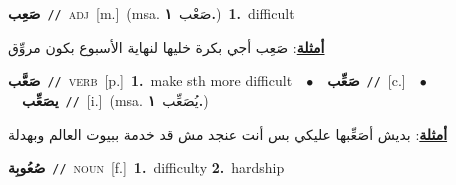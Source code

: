 \documentclass[10pt,a4paper,twoside]{article} %
\begin{document}
\begin{multicols}{2}
{\setlength\topsep{0pt}\textbf{\foreignlanguage{arabic}{صَعِب}}\ {\color{gray}\texttt{//}\color{black}}\ \textsc{adj}\ [m.]\ \color{gray}(msa. \foreignlanguage{arabic}{صَعْب}~\foreignlanguage{arabic}{\textbf{١.}})\color{black}\ \textbf{1.}~difficult\  \begin{flushright}\color{gray}\foreignlanguage{arabic}{\textbf{\underline{\foreignlanguage{arabic}{أمثلة}}}: صَعِب أجي بكرة خليها لنهاية الأسبوع بكون مروِّق}\end{flushright}\color{black}} \vspace{2mm}

{\setlength\topsep{0pt}\textbf{\foreignlanguage{arabic}{صَعَّب}}\ {\color{gray}\texttt{//}\color{black}}\ \textsc{verb}\ [p.]\ \textbf{1.}~make sth more difficult\ \ $\bullet$\ \ \setlength\topsep{0pt}\textbf{\foreignlanguage{arabic}{صَعِّب}}\ {\color{gray}\texttt{//}\color{black}}\ [c.]\ \ $\bullet$\ \ \setlength\topsep{0pt}\textbf{\foreignlanguage{arabic}{يصَعِّب}}\ {\color{gray}\texttt{//}\color{black}}\ [i.]\ \color{gray}(msa. \foreignlanguage{arabic}{يُصَعِّب}~\foreignlanguage{arabic}{\textbf{١.}})\color{black}\  \begin{flushright}\color{gray}\foreignlanguage{arabic}{\textbf{\underline{\foreignlanguage{arabic}{أمثلة}}}: بديش أصَعِّبها عليكي بس أنت عنجد مش قد خدمة ببيوت العالم وبهدلة}\end{flushright}\color{black}} \vspace{2mm}

{\setlength\topsep{0pt}\textbf{\foreignlanguage{arabic}{صُعُوبِة}}\ {\color{gray}\texttt{//}\color{black}}\ \textsc{noun}\ [f.]\ \textbf{1.}~difficulty  \textbf{2.}~hardship\ } \vspace{2mm}


\end{multicols}
\end{document}

